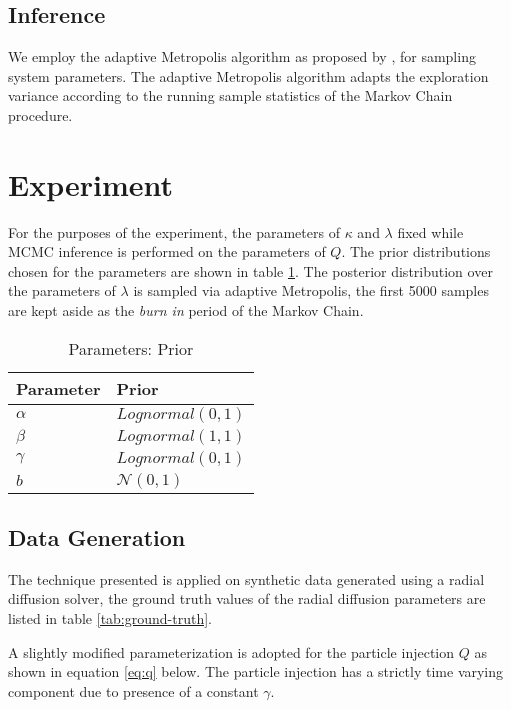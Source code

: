 \subsection{Inference}

We employ the adaptive Metropolis algorithm as proposed by \citet{haario2001}, for sampling
system parameters. The adaptive Metropolis algorithm adapts the exploration variance according
to the running sample statistics of the Markov Chain procedure.


\section{Experiment}\label{sec:exp}

For the purposes of the experiment, the parameters of $\kappa$ and $\lambda$ fixed while MCMC inference 
is performed on the parameters of $Q$. The prior distributions chosen for the parameters 
are shown in table \ref{tab:prior}. The posterior distribution over the parameters of $\lambda$ is 
sampled via adaptive Metropolis, the first 5000 samples are kept aside as the \emph{burn in} period
of the Markov Chain.

\begin{table}[t]
  \caption{Parameters: Prior}
  \label{tab:prior}
  \centering
  \begin{tabular}{ll}
    \toprule
    \cmidrule{1-2}
    Parameter     & Prior\\
    \midrule
    $\alpha$ & $Lognormal(0, 1)$ \\
    $\beta$  & $Lognormal(1, 1)$ \\ 
    $\gamma$ & $Lognormal(0, 1)$ \\ 
    $b$ & $\mathcal{N}(0, 1)$ \\
    \bottomrule
  \end{tabular}
\end{table}


\subsection*{Data Generation}

The technique presented is applied on synthetic data generated using a radial diffusion solver, 
the ground truth values of the radial diffusion parameters are listed in table \ref{tab:ground-truth}.

A slightly modified parameterization is adopted for the particle injection $Q$ as shown in equation \ref{eq:q} below. The particle injection has a strictly time varying component due to presence of a constant $\gamma$.

